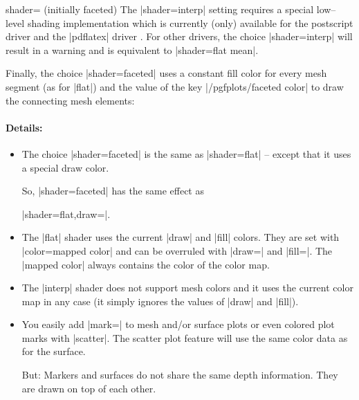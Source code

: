 \begin{pgfplotskey}{shader= (initially faceted)}
	The |shader=interp| setting requires a special low--level shading implementation which is currently (only) available for the postscript driver  and the |pdflatex| driver . For other drivers, the choice |shader=interp| will result in a warning and is equivalent to |shader=flat mean|. 
	


	Finally, the choice |shader=faceted| uses a constant fill color for every mesh segment (as for |flat|) and the value of the key |/pgfplots/faceted color| to draw the connecting mesh elements:
\pgfplotsexpensiveexample
\begin{codeexample}[]
\end{codeexample}


	\paragraph{Details:}
	\begin{itemize}
		\item The choice |shader=faceted| is the same as |shader=flat| -- except that it uses a special draw color.
		
		So, |shader=faceted| has the same effect as 
		
		|shader=flat,draw=|.

		\item The |flat| shader uses the current |draw| and |fill| colors. They are set with |color=mapped color| and can be overruled with |draw=| and |fill=|. The |mapped color| always contains the color of the color map. 
		
		\item The |interp| shader does not support mesh colors and it uses the current color map in any case (it simply ignores the values of |draw| and |fill|).

		\item You easily add |mark=| to mesh and/or surface plots or even colored plot marks with |scatter|. The scatter plot feature will use the same color data as for the surface.

		But: Markers and surfaces do not share the same depth information. They are drawn on top of each other.


\end{itemize}
\end{pgfplotskey}
